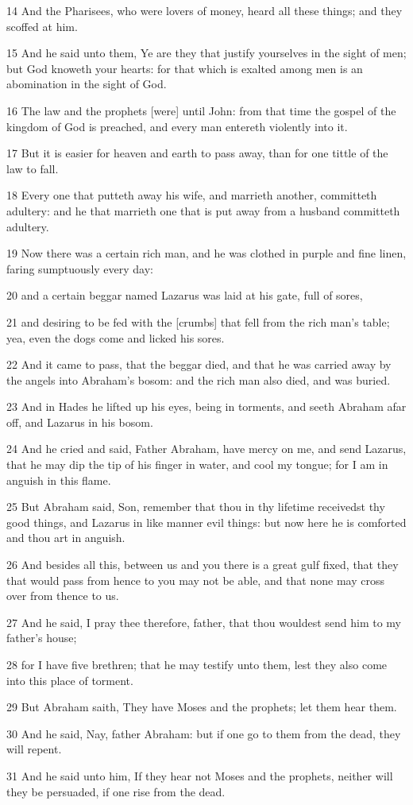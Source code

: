 \par 14 And the Pharisees, who were lovers of money, heard all these things; and they scoffed at him.
\par 15 And he said unto them, Ye are they that justify yourselves in the sight of men; but God knoweth your hearts: for that which is exalted among men is an abomination in the sight of God.
\par 16 The law and the prophets [were] until John: from that time the gospel of the kingdom of God is preached, and every man entereth violently into it.
\par 17 But it is easier for heaven and earth to pass away, than for one tittle of the law to fall.
\par 18 Every one that putteth away his wife, and marrieth another, committeth adultery: and he that marrieth one that is put away from a husband committeth adultery.
\par 19 Now there was a certain rich man, and he was clothed in purple and fine linen, faring sumptuously every day:
\par 20 and a certain beggar named Lazarus was laid at his gate, full of sores,
\par 21 and desiring to be fed with the [crumbs] that fell from the rich man's table; yea, even the dogs come and licked his sores.
\par 22 And it came to pass, that the beggar died, and that he was carried away by the angels into Abraham's bosom: and the rich man also died, and was buried.
\par 23 And in Hades he lifted up his eyes, being in torments, and seeth Abraham afar off, and Lazarus in his bosom.
\par 24 And he cried and said, Father Abraham, have mercy on me, and send Lazarus, that he may dip the tip of his finger in water, and cool my tongue; for I am in anguish in this flame.
\par 25 But Abraham said, Son, remember that thou in thy lifetime receivedst thy good things, and Lazarus in like manner evil things: but now here he is comforted and thou art in anguish.
\par 26 And besides all this, between us and you there is a great gulf fixed, that they that would pass from hence to you may not be able, and that none may cross over from thence to us.
\par 27 And he said, I pray thee therefore, father, that thou wouldest send him to my father's house;
\par 28 for I have five brethren; that he may testify unto them, lest they also come into this place of torment.
\par 29 But Abraham saith, They have Moses and the prophets; let them hear them.
\par 30 And he said, Nay, father Abraham: but if one go to them from the dead, they will repent.
\par 31 And he said unto him, If they hear not Moses and the prophets, neither will they be persuaded, if one rise from the dead.

